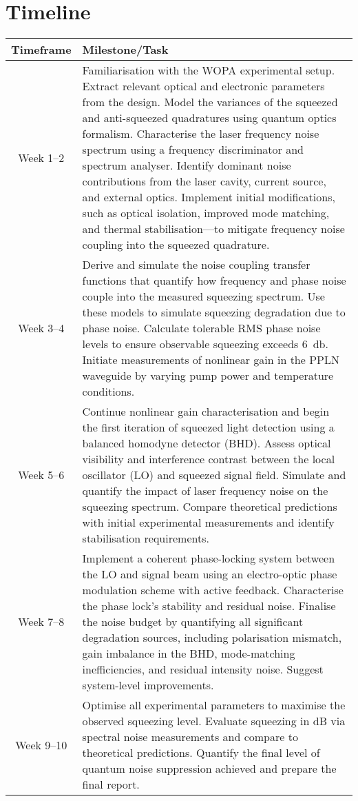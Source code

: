 \documentclass[colorlinks=true,pdfstartview=FitV,linkcolor=blue,
citecolor=red,urlcolor=magenta]{ligodoc}
\begin{document}
 \section{Timeline}
\begin{longtable}{|c|p{11cm}|}
\hline
\textbf{Timeframe} & \textbf{Milestone/Task} \\
\hline
Week 1--2 & Familiarisation with the WOPA experimental setup. Extract relevant optical and electronic parameters from the design. Model the variances of the squeezed and anti-squeezed quadratures using quantum optics formalism. Characterise the laser frequency noise spectrum using a frequency discriminator and spectrum analyser. Identify dominant noise contributions from the laser cavity, current source, and external optics. Implement initial modifications, such as optical isolation, improved mode matching, and thermal stabilisation—to mitigate frequency noise coupling into the squeezed quadrature. \\
\hline
Week 3--4 & Derive and simulate the noise coupling transfer functions that quantify how frequency and phase noise couple into the measured squeezing spectrum. Use these models to simulate squeezing degradation due to phase noise. Calculate tolerable RMS phase noise levels to ensure observable squeezing exceeds \SI{6}{\decibel}. Initiate measurements of nonlinear gain in the PPLN waveguide by varying pump power and temperature conditions. \\
\hline
Week 5--6 & Continue nonlinear gain characterisation and begin the first iteration of squeezed light detection using a balanced homodyne detector (BHD). Assess optical visibility and interference contrast between the local oscillator (LO) and squeezed signal field. Simulate and quantify the impact of laser frequency noise on the squeezing spectrum. Compare theoretical predictions with initial experimental measurements and identify stabilisation requirements. \\
\hline
Week 7--8 & Implement a coherent phase-locking system between the LO and signal beam using an electro-optic phase modulation scheme with active feedback. Characterise the phase lock's stability and residual noise. Finalise the noise budget by quantifying all significant degradation sources, including polarisation mismatch, gain imbalance in the BHD, mode-matching inefficiencies, and residual intensity noise. Suggest system-level improvements. \\
\hline
Week 9--10 & Optimise all experimental parameters to maximise the observed squeezing level. Evaluate squeezing in dB via spectral noise measurements and compare to theoretical predictions. Quantify the final level of quantum noise suppression achieved and prepare the final report. \\
\hline
\end{longtable}
\end{document}
